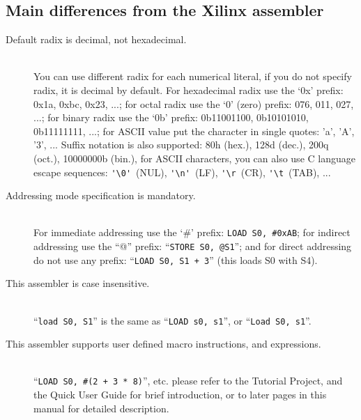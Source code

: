     \subsection{Main differences from the Xilinx assembler}
        \begin{description}
            \item[Default radix is decimal, not hexadecimal.]~\\
                You can use different radix for each numerical literal, if you do not specify radix, it is decimal by default. For hexadecimal radix use the `0x' prefix: 0x1a, 0xbc, 0x23, ...; for octal radix use the `0' (zero) prefix: 076, 011, 027, ...; for binary radix use the `0b' prefix: 0b11001100, 0b10101010, 0b11111111, ...; for ASCII value put the character in single quotes: 'a', 'A', '3', ... Suffix notation is also supported: 80h (hex.), 128d (dec.), 200q (oct.), 10000000b (bin.), for ASCII characters, you can also use C language escape sequences: \verb"'\0'"~(NUL), \verb"'\n'"~(LF), \verb"'\r"~(CR), \verb"'\t"~(TAB), ...
            \item[Addressing mode specification is mandatory.]~\\
                For immediate addressing use the `\#' prefix: \texttt{LOAD~S0,~\#0xAB}; for indirect addressing use the ``@'' prefix: ``\texttt{STORE~S0,~@S1}''; and for direct addressing do not use any prefix: ``\texttt{LOAD~S0,~S1~+~3}'' (this loads S0 with S4).
            \item[This assembler is case insensitive.]~\\
                ``\texttt{load~S0,~S1}'' is the same as ``\texttt{LOAD~s0,~s1}'', or ``\texttt{Load~S0,~s1}''.
            \item[This assembler supports user defined macro instructions, and expressions.]~\\
                ``\texttt{LOAD~S0,~\#(2~+~3~*~8)}'', etc. please refer to the Tutorial Project, and the Quick User Guide for brief introduction, or to later pages in this manual for detailed description.
        \end{description}
